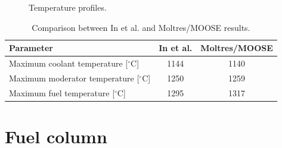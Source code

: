 \begin{figure}[htbp!]
  \centering
  \hfill
  \caption{Temperature profiles.}
  \label{fig:th-val-unit-temps}
\end{figure}

\begin{table}[htbp!]
\centering
    \caption{Comparison between In et al. and Moltres/MOOSE results.}
    \label{tab:th-val-unit-results}
    \begin{tabular}{@{}l c c}
    \toprule
  Parameter                                   & In et al. & Moltres/MOOSE \\
    \midrule
  Maximum coolant temperature [$^{\circ}$C]   & 1144      & 1140    \\
  Maximum moderator temperature [$^{\circ}$C] & 1250      & 1259    \\
  Maximum fuel temperature [$^{\circ}$C]      & 1295      & 1317    \\
    \bottomrule
  \end{tabular}
\end{table}

\section{Fuel column}
\label{sec:fuelcol}

